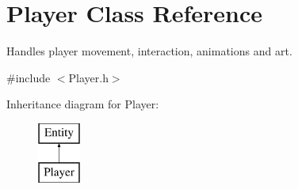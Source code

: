 \hypertarget{class_player}{}\section{Player Class Reference}
\label{class_player}


Handles player movement, interaction, animations and art.  




{\ttfamily \#include $<$Player.\+h$>$}

Inheritance diagram for Player\+:\begin{figure}[H]
\begin{center}
\leavevmode
\includegraphics[height=2.000000cm]{class_player}
\end{center}
\end{figure}
